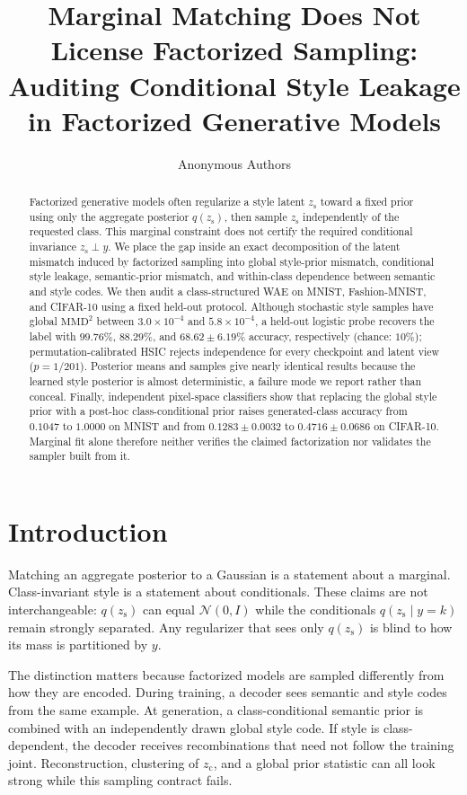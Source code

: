 \documentclass{article}
\title{Marginal Matching Does Not License Factorized Sampling:\\
Auditing Conditional Style Leakage in Factorized Generative Models}
\author{Anonymous Authors}
\newcommand{\zc}{z_{\mathrm{c}}}
\newcommand{\zs}{z_{\mathrm{s}}}
\newcommand{\MMD}{\mathrm{MMD}}
\begin{document}
\maketitle

\begin{abstract}
Factorized generative models often regularize a style latent $\zs$ toward a
fixed prior using only the aggregate posterior $q(\zs)$, then sample $\zs$
independently of the requested class.  This marginal constraint does not
certify the required conditional invariance $\zs\perp y$.  We place the gap
inside an exact decomposition of the latent mismatch induced by factorized
sampling into global style-prior mismatch, conditional style leakage,
semantic-prior mismatch, and within-class dependence between semantic and
style codes.  We then audit a class-structured WAE on MNIST, Fashion-MNIST,
and CIFAR-10 using a fixed held-out protocol.  Although stochastic style
samples have global $\MMD^2$ between $3.0\!\times\!10^{-4}$ and
$5.8\!\times\!10^{-4}$, a held-out logistic probe recovers the label with
$99.76\%$, $88.29\%$, and $68.62\!\pm\!6.19\%$ accuracy, respectively
(chance: $10\%$); permutation-calibrated HSIC rejects independence for every
checkpoint and latent view ($p=1/201$).  Posterior means and samples give
nearly identical results because the learned style posterior is almost
deterministic, a failure mode we report rather than conceal.  Finally,
independent pixel-space classifiers show that replacing the global style
prior with a post-hoc class-conditional prior raises generated-class accuracy
from $0.1047$ to $1.0000$ on MNIST and from
$0.1283\!\pm\!0.0032$ to $0.4716\!\pm\!0.0686$ on CIFAR-10.  Marginal fit alone
therefore neither verifies the claimed factorization nor validates the
sampler built from it.
\end{abstract}

\section{Introduction}
\label{sec:intro}

Matching an aggregate posterior to a Gaussian is a statement about a
marginal.  Class-invariant style is a statement about conditionals.  These
claims are not interchangeable: $q(\zs)$ can equal $\mathcal N(0,I)$ while
the conditionals $q(\zs\mid y=k)$ remain strongly separated.  Any regularizer
that sees only $q(\zs)$ is blind to how its mass is partitioned by $y$.

The distinction matters because factorized models are sampled differently
from how they are encoded.  During training, a decoder sees semantic and
style codes from the same example.  At generation, a class-conditional
semantic prior is combined with an independently drawn global style code.
If style is class-dependent, the decoder receives recombinations that need
not follow the training joint.  Reconstruction, clustering of $\zc$, and a
global prior statistic can all look strong while this sampling contract
fails.
\end{document}
